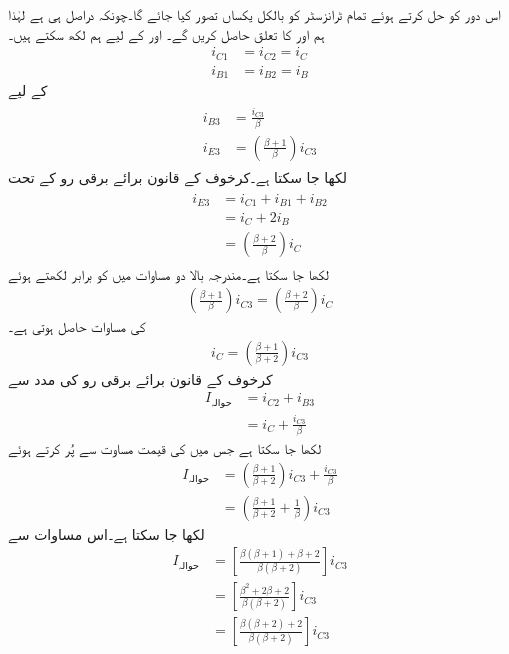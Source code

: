 اس دور کو حل کرتے ہوئے تمام ٹرانزسٹر کو بالکل یکساں تصور کیا جائے گا۔چونکہ  دراصل  ہی ہے لہٰذا ہم  اور  کا تعلق حاصل کریں گے۔ اور  کے لیے ہم لکھ سکتے ہیں۔
\begin{align*}
i_{C1}&=i_{C2}=i_C\\
i_{B1}&=i_{B2}=i_B
\end{align*}
 کے لیے
\begin{gather}\label{مساوات_تفرقی_ولسن_تیسرے_ٹرانزسٹر_رو}
\begin{aligned}
i_{B3}&=\frac{i_{C3}}{\beta}\\
i_{E3}&=\left(\frac{\beta+1}{\beta}\right) i_{C3}
\end{aligned}
\end{gather}
لکھا جا سکتا ہے۔کرخوف کے قانون برائے برقی رو کے تحت
\begin{gather}
\begin{aligned}\label{مساوات_تفرقی_ولسن_کرخوف_کا_قانون}
i_{E3}&=i_{C1}+i_{B1}+i_{B2}\\
&=i_C+2 i_B\\
&=\left(\frac{\beta+2}{\beta} \right) i_C
\end{aligned}
\end{gather}
لکھا جا سکتا ہے۔مندرجہ بالا دو مساوات میں  کو برابر لکھتے ہوئے
\begin{align*}
\left(\frac{\beta+1}{\beta}\right) i_{C3}=\left(\frac{\beta+2}{\beta} \right) i_C
\end{align*}
 کی مساوات حاصل ہوتی ہے۔
\begin{align}\label{مساوات_تفرقی_محاصل_رو_کی_مساوات}
i_C=\left(\frac{\beta+1}{\beta+2}\right) i_{C3}
\end{align}
کرخوف کے قانون برائے برقی رو کی مدد سے 
\begin{align*}
I_{\textrm{حوالہ}}&=i_{C2}+i_{B3}\\
&=i_{C}+\frac{i_{C3}}{\beta}
\end{align*}
لکھا جا سکتا ہے جس میں  کی قیمت مساوت  سے پُر کرتے ہوئے
\begin{align*}
I_{\textrm{حوالہ}}&=\left(\frac{\beta+1}{\beta+2}\right) i_{C3}+\frac{i_{C3}}{\beta}\\
&=\left(\frac{\beta+1}{\beta+2}+\frac{1}{\beta} \right) i_{C3}
\end{align*}
لکھا جا سکتا ہے۔اس مساوات سے
\begin{align*}
I_{\textrm{حوالہ}}&=\left[\frac{\beta \left(\beta+1 \right)+\beta+2}{\beta \left(\beta+2 \right)}\right]i_{C3}\\
&=\left[\frac{\beta^2+2 \beta+2}{\beta \left(\beta+2 \right)}\right]i_{C3}\\
&=\left[\frac{\beta \left(\beta+2 \right)+2}{\beta \left(\beta+2 \right)}\right]i_{C3}
\end{align*}
